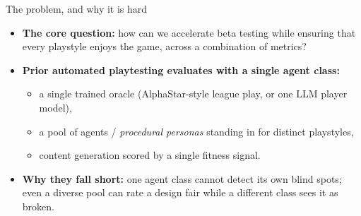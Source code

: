 \documentclass[10pt,aspectratio=169]{beamer}
\begin{document}
\begin{frame}{The problem, and why it is hard}
  \begin{itemize}\itemsep=0.7em
    \item \textbf{The core question:} how can we accelerate beta testing while ensuring that every playstyle enjoys the game, across a combination of metrics?
    \item \textbf{Prior automated playtesting evaluates with a single agent class:}
      \begin{itemize}\itemsep=0.2em
        \item a single trained oracle (AlphaStar-style league play, or one LLM player model),
        \item a pool of agents / \emph{procedural personas} standing in for distinct playstyles,
        \item content generation scored by a single fitness signal.
      \end{itemize}
    \item \textbf{Why they fall short:} one agent class cannot detect its own blind spots; even a diverse pool can rate a design fair while a different class sees it as broken.
  \end{itemize}
\end{frame}
\end{document}
